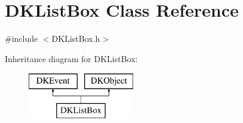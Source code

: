 \hypertarget{class_d_k_list_box}{\section{D\-K\-List\-Box Class Reference}
\label{class_d_k_list_box}
}


{\ttfamily \#include $<$D\-K\-List\-Box.\-h$>$}

Inheritance diagram for D\-K\-List\-Box\-:\begin{figure}[H]
\begin{center}
\leavevmode
\includegraphics[height=2.000000cm]{class_d_k_list_box}
\end{center}
\end{figure}
